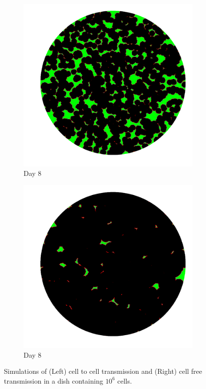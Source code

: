 \documentclass[a4paper]{article}
\begin{document}
\begin{center}
\begin{minipage}{0.65\linewidth}
\begin{figure}[H]
    \begin{subfigure}[b]{0.4\linewidth}
        \includegraphics[width=\linewidth]{cell_to_cell_photos/celltocell4.png}
        \caption{Day 8}
    \end{subfigure}
    \begin{subfigure}[b]{0.4\linewidth}
        \includegraphics[width=\linewidth]{cell_free_photos/cellfree4.png}
        \caption{Day 8}
    \end{subfigure}
    \caption{Simulations of (Left) cell to cell transmission and (Right) cell free transmission in a dish containing $10^{6}$ cells.}
    \label{fig:celltocell}
\end{figure}
\end{minipage}
\end{center}
\end{document}
